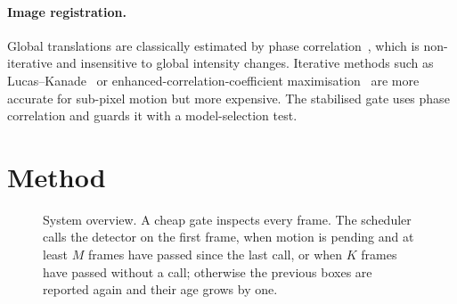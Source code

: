 \documentclass[12pt,a4paper]{article}
\theoremstyle{plain}
\theoremstyle{definition}
\begin{document}
\paragraph{Image registration.} Global translations are classically estimated by phase correlation~\cite{kuglin1975phase}, which is non-iterative and insensitive to global intensity changes. Iterative methods such as Lucas--Kanade~\cite{lucas1981iterative} or enhanced-correlation-coefficient maximisation~\cite{evangelidis2008ecc} are more accurate for sub-pixel motion but more expensive. The stabilised gate uses phase correlation and guards it with a model-selection test.


\newpage

\section{Method}\label{sec:method}

\begin{figure}[t]
\centering
{}
\caption{System overview. A cheap gate inspects every frame. The scheduler calls the detector on the first frame, when motion is pending and at least $M$ frames have passed since the last call, or when $K$ frames have passed without a call; otherwise the previous boxes are reported again and their age grows by one.}
\label{fig:system}
\end{figure}
\end{document}
